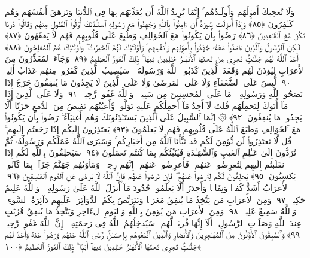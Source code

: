  وَلَا تُعجِبكَ أَموَٟلُهُم وَأَولَـٰدُهُم ۚ إِنَّمَا يُرِيدُ ٱللَّهُ أَن يُعَذِّبَهُم بِهَا فِى ٱلدُّنيَا وَتَزهَقَ أَنفُسُهُم وَهُم كَـٰفِرُونَ ﴿٨٥﴾
 وَإِذَآ أُنزِلَت سُورَةٌ أَن ءَامِنُوا۟ بِٱللَّهِ وَجَٰهِدُوا۟ مَعَ رَسُولِهِ ٱستَـٔذَنَكَ أُو۟لُوا۟ ٱلطَّولِ مِنهُم وَقَالُوا۟ ذَرنَا نَكُن مَّعَ ٱلقَـٰعِدِينَ ﴿٨٦﴾
 رَضُوا۟ بِأَن يَكُونُوا۟ مَعَ ٱلخَوَالِفِ وَطُبِعَ عَلَىٰ قُلُوبِهِم فَهُم لَا يَفقَهُونَ ﴿٨٧﴾
 لَـٰكِنِ ٱلرَّسُولُ وَٱلَّذِينَ ءَامَنُوا۟ مَعَهُۥ جَٰهَدُوا۟ بِأَموَٟلِهِم وَأَنفُسِهِم ۚ وَأُو۟لَـٰٓئِكَ لَهُمُ ٱلخَيرَٰتُ ۖ وَأُو۟لَـٰٓئِكَ هُمُ ٱلمُفلِحُونَ ﴿٨٨﴾
 أَعَدَّ ٱللَّهُ لَهُم جَنَّـٰتٍۢ تَجرِى مِن تَحتِهَا ٱلأَنهَـٰرُ خَـٰلِدِينَ فِيهَا ۚ ذَٟلِكَ ٱلفَوزُ ٱلعَظِيمُ ﴿٨٩﴾
 وَجَآءَ ٱلمُعَذِّرُونَ مِنَ ٱلأَعرَابِ لِيُؤذَنَ لَهُم وَقَعَدَ ٱلَّذِينَ كَذَبُوا۟ ٱللَّهَ وَرَسُولَهُۥ ۚ سَيُصِيبُ ٱلَّذِينَ كَفَرُوا۟ مِنهُم عَذَابٌ أَلِيمٌۭ ﴿٩٠﴾
 لَّيسَ عَلَى ٱلضُّعَفَآءِ وَلَا عَلَى ٱلمَرضَىٰ وَلَا عَلَى ٱلَّذِينَ لَا يَجِدُونَ مَا يُنفِقُونَ حَرَجٌ إِذَا نَصَحُوا۟ لِلَّهِ وَرَسُولِهِۦ ۚ مَا عَلَى ٱلمُحسِنِينَ مِن سَبِيلٍۢ ۚ وَٱللَّهُ غَفُورٌۭ رَّحِيمٌۭ ﴿٩١﴾
 وَلَا عَلَى ٱلَّذِينَ إِذَا مَآ أَتَوكَ لِتَحمِلَهُم قُلتَ لَآ أَجِدُ مَآ أَحمِلُكُم عَلَيهِ تَوَلَّوا۟ وَّأَعيُنُهُم تَفِيضُ مِنَ ٱلدَّمعِ حَزَنًا أَلَّا يَجِدُوا۟ مَا يُنفِقُونَ ﴿٩٢﴾
 ۞ إِنَّمَا ٱلسَّبِيلُ عَلَى ٱلَّذِينَ يَستَـٔذِنُونَكَ وَهُم أَغنِيَآءُ ۚ رَضُوا۟ بِأَن يَكُونُوا۟ مَعَ ٱلخَوَالِفِ وَطَبَعَ ٱللَّهُ عَلَىٰ قُلُوبِهِم فَهُم لَا يَعلَمُونَ ﴿٩٣﴾
 يَعتَذِرُونَ إِلَيكُم إِذَا رَجَعتُم إِلَيهِم ۚ قُل لَّا تَعتَذِرُوا۟ لَن نُّؤمِنَ لَكُم قَد نَبَّأَنَا ٱللَّهُ مِن أَخبَارِكُم ۚ وَسَيَرَى ٱللَّهُ عَمَلَكُم وَرَسُولُهُۥ ثُمَّ تُرَدُّونَ إِلَىٰ عَـٰلِمِ ٱلغَيبِ وَٱلشَّهَـٰدَةِ فَيُنَبِّئُكُم بِمَا كُنتُم تَعمَلُونَ ﴿٩٤﴾
 سَيَحلِفُونَ بِٱللَّهِ لَكُم إِذَا ٱنقَلَبتُم إِلَيهِم لِتُعرِضُوا۟ عَنهُم ۖ فَأَعرِضُوا۟ عَنهُم ۖ إِنَّهُم رِجسٌۭ ۖ وَمَأوَىٰهُم جَهَنَّمُ جَزَآءًۢ بِمَا كَانُوا۟ يَكسِبُونَ ﴿٩٥﴾
 يَحلِفُونَ لَكُم لِتَرضَوا۟ عَنهُم ۖ فَإِن تَرضَوا۟ عَنهُم فَإِنَّ ٱللَّهَ لَا يَرضَىٰ عَنِ ٱلقَومِ ٱلفَـٰسِقِينَ ﴿٩٦﴾
 ٱلأَعرَابُ أَشَدُّ كُفرًۭا وَنِفَاقًۭا وَأَجدَرُ أَلَّا يَعلَمُوا۟ حُدُودَ مَآ أَنزَلَ ٱللَّهُ عَلَىٰ رَسُولِهِۦ ۗ وَٱللَّهُ عَلِيمٌ حَكِيمٌۭ ﴿٩٧﴾
 وَمِنَ ٱلأَعرَابِ مَن يَتَّخِذُ مَا يُنفِقُ مَغرَمًۭا وَيَتَرَبَّصُ بِكُمُ ٱلدَّوَآئِرَ ۚ عَلَيهِم دَآئِرَةُ ٱلسَّوءِ ۗ وَٱللَّهُ سَمِيعٌ عَلِيمٌۭ ﴿٩٨﴾
 وَمِنَ ٱلأَعرَابِ مَن يُؤمِنُ بِٱللَّهِ وَٱليَومِ ٱلءَاخِرِ وَيَتَّخِذُ مَا يُنفِقُ قُرُبَٰتٍ عِندَ ٱللَّهِ وَصَلَوَٟتِ ٱلرَّسُولِ ۚ أَلَآ إِنَّهَا قُربَةٌۭ لَّهُم ۚ سَيُدخِلُهُمُ ٱللَّهُ فِى رَحمَتِهِۦٓ ۗ إِنَّ ٱللَّهَ غَفُورٌۭ رَّحِيمٌۭ ﴿٩٩﴾
 وَٱلسَّٰبِقُونَ ٱلأَوَّلُونَ مِنَ ٱلمُهَـٰجِرِينَ وَٱلأَنصَارِ وَٱلَّذِينَ ٱتَّبَعُوهُم بِإِحسَـٰنٍۢ رَّضِىَ ٱللَّهُ عَنهُم وَرَضُوا۟ عَنهُ وَأَعَدَّ لَهُم جَنَّـٰتٍۢ تَجرِى تَحتَهَا ٱلأَنهَـٰرُ خَـٰلِدِينَ فِيهَآ أَبَدًۭا ۚ ذَٟلِكَ ٱلفَوزُ ٱلعَظِيمُ ﴿١٠٠﴾
